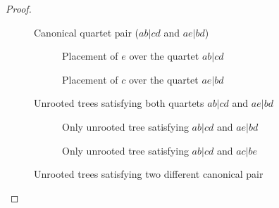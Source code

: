 \documentclass[10pt,a4paper]{article}
\begin{document}
\begin{proof}
\begin{itemize}
\begin{itemize}
\begin{figure}[h] 
\centering
    \hfill
     \hfill
     \hfill
    \hfill
    \caption{Canonical quartet pair ($ab|cd$ and $ae|bd$) }
    \label{fig:canonical_pair}
\end{figure}

\begin{figure}[h]
    \centering
    \begin{subfigure}{0.45\textwidth}
        \centering
        \caption{Placement of $e$ over the quartet $ab|cd$}
        \label{fig:place_e_on_ab|cd}
    \end{subfigure}
    \hfill 
    \begin{subfigure}{0.45\textwidth}
        \centering
        \caption{Placement of $c$ over the quartet $ae|bd$}
        \label{fig:place_c_on_ae|bd}
    \end{subfigure}
    \caption{Unrooted trees satisfying both quartets $ab|cd$ and $ae|bd$}
    \label{fig:comparison_e_and_c}
\end{figure}

\begin{figure}[h]
    \centering
    \begin{subfigure}{0.45\textwidth}
        \centering
        \caption{Only unrooted tree satisfying $ab|cd$ and $ae|bd$}
        \label{fig:unrooted_tree_1}
    \end{subfigure}
    \hfill 
    \centering
    \begin{subfigure}{0.45\textwidth}
        \centering
        \caption{Only unrooted tree satisfying $ab|cd$ and $ac|be$}
        \label{fig:unrooted_tree_2}
    \end{subfigure}
    \caption{Unrooted trees satisfying two different canonical pair}
    
\end{figure}




\end{itemize}
\end{itemize}
\end{proof}
\end{document}
